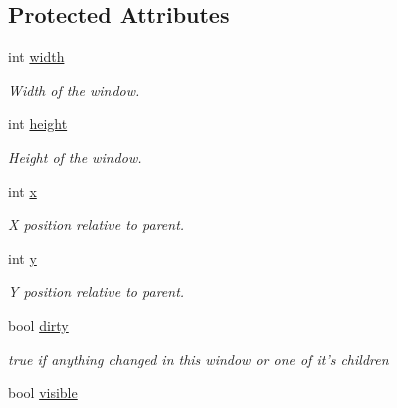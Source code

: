 \subsection*{Protected Attributes}
\begin{DoxyCompactItemize}
\item 
\hypertarget{classGUI_1_1Window_a6cd42974c2b9239d05dac79d284f427d}{int \hyperlink{classGUI_1_1Window_a6cd42974c2b9239d05dac79d284f427d}{width}}\label{classGUI_1_1Window_a6cd42974c2b9239d05dac79d284f427d}

\begin{DoxyCompactList}\small\item\em Width of the window. \end{DoxyCompactList}\item 
\hypertarget{classGUI_1_1Window_a5bbb3975f91e7572fc1a91c44e59d212}{int \hyperlink{classGUI_1_1Window_a5bbb3975f91e7572fc1a91c44e59d212}{height}}\label{classGUI_1_1Window_a5bbb3975f91e7572fc1a91c44e59d212}

\begin{DoxyCompactList}\small\item\em Height of the window. \end{DoxyCompactList}\item 
\hypertarget{classGUI_1_1Window_a6ca6a80ca00c9e1d8ceea8d3d99a657d}{int \hyperlink{classGUI_1_1Window_a6ca6a80ca00c9e1d8ceea8d3d99a657d}{x}}\label{classGUI_1_1Window_a6ca6a80ca00c9e1d8ceea8d3d99a657d}

\begin{DoxyCompactList}\small\item\em X position relative to parent. \end{DoxyCompactList}\item 
\hypertarget{classGUI_1_1Window_a0ee8e923aff2c3661fc2e17656d37adf}{int \hyperlink{classGUI_1_1Window_a0ee8e923aff2c3661fc2e17656d37adf}{y}}\label{classGUI_1_1Window_a0ee8e923aff2c3661fc2e17656d37adf}

\begin{DoxyCompactList}\small\item\em Y position relative to parent. \end{DoxyCompactList}\item 
\hypertarget{classGUI_1_1Window_a8ac8edf3298db718e7b83cffda2c10e5}{bool \hyperlink{classGUI_1_1Window_a8ac8edf3298db718e7b83cffda2c10e5}{dirty}}\label{classGUI_1_1Window_a8ac8edf3298db718e7b83cffda2c10e5}

\begin{DoxyCompactList}\small\item\em {\ttfamily true} if anything changed in this window or one of it's children \end{DoxyCompactList}\item 
\hypertarget{classGUI_1_1Window_a49e31f7879bf287c02f29d67414ec37d}{bool \hyperlink{classGUI_1_1Window_a49e31f7879bf287c02f29d67414ec37d}{visible}}\label{classGUI_1_1Window_a49e31f7879bf287c02f29d67414ec37d}


\end{DoxyCompactItemize}
